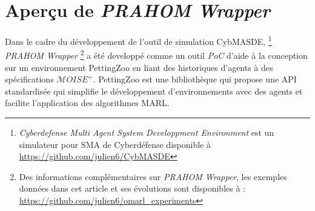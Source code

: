 \documentclass[demonstration]{jfsma}
\newcounter{relation}
\begin{document}
\section{Aperçu de \emph{PRAHOM Wrapper}}


Dans le cadre du développement de l'outil de simulation CybMASDE,
\footnote{\emph{Cyberdefense Multi Agent System Developpment Environment} est un simulateur pour SMA de Cyberdéfense disponible à \url{https://github.com/julien6/CybMASDE}}
\emph{PRAHOM Wrapper}\label{PettingZoo-wrapper}
\footnote{Des informations complémentaires sur \emph{PRAHOM Wrapper}, les exemples données dans cet article et ses évolutions sont disponibles à : \url{https://github.com/julien6/omarl_experiments}}
a été developpé comme un outil \emph{PoC} d'aide à la conception sur un environnement PettingZoo en liant des historiques d'agents à des spécifications $\mathcal{M}OISE^+$. PettingZoo est une bibliothèque qui propose une API standardisée qui simplifie le développement d'environnements avec des agents et facilite l'application des algorithmes MARL.
\end{document}
